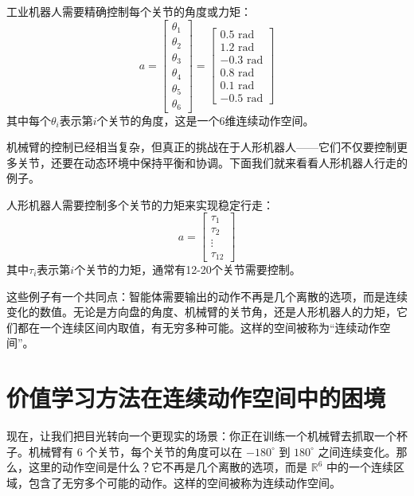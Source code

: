 \documentclass[lang=cn,zihao=-4,a4paper,fontset=windows]{beautybook}
\begin{document}
\begin{example}[][6自由度机械臂控制]
工业机器人需要精确控制每个关节的角度或力矩：
\[
a = \begin{bmatrix}
\theta_1 \\ \theta_2 \\ \theta_3 \\ \theta_4 \\ \theta_5 \\ \theta_6
\end{bmatrix} = \begin{bmatrix}
0.5 \text{ rad} \\ 1.2 \text{ rad} \\ -0.3 \text{ rad} \\ 0.8 \text{ rad} \\ 0.1 \text{ rad} \\ -0.5 \text{ rad}
\end{bmatrix}
\]
其中每个$\theta_i$表示第$i$个关节的角度，这是一个6维连续动作空间。
\end{example}

机械臂的控制已经相当复杂，但真正的挑战在于人形机器人——它们不仅要控制更多关节，还要在动态环境中保持平衡和协调。下面我们就来看看人形机器人行走的例子。

\begin{example}[][人形机器人行走]
人形机器人需要控制多个关节的力矩来实现稳定行走：
\[
a = \begin{bmatrix}
\tau_1 \\ \tau_2 \\ \vdots \\ \tau_{12}
\end{bmatrix}
\]
其中$\tau_i$表示第$i$个关节的力矩，通常有12-20个关节需要控制。
\end{example}

这些例子有一个共同点：智能体需要输出的动作不再是几个离散的选项，而是连续变化的数值。无论是方向盘的角度、机械臂的关节角，还是人形机器人的力矩，它们都在一个连续区间内取值，有无穷多种可能。这样的空间被称为“连续动作空间”。

\section{价值学习方法在连续动作空间中的困境}

现在，让我们把目光转向一个更现实的场景：你正在训练一个机械臂去抓取一个杯子。机械臂有 6 个关节，每个关节的角度可以在 $-180^\circ$ 到 $180^\circ$ 之间连续变化。那么，这里的动作空间是什么？它不再是几个离散的选项，而是 $\mathbb{R}^6$ 中的一个连续区域，包含了无穷多个可能的动作。这样的空间被称为连续动作空间。
\end{document}
